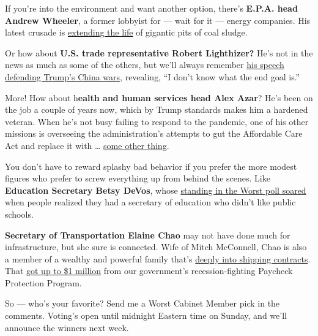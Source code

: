 If you're into the environment and want another option, there's
\textbf{E.P.A. head Andrew Wheeler}, a former lobbyist for --- wait for
it --- energy companies. His latest crusade is
\href{https://thehill.com/policy/energy-environment/509792-epa-rule-extends-life-of-toxic-coal-ash-ponds}{extending
the life} of gigantic pits of coal sludge.

Or how about \textbf{U.S. trade representative Robert Lighthizer?} He's
not in the news as much as some of the others, but we'll always remember
\href{https://www.scmp.com/news/world/united-states-canada/article/3092578/us-negotiator-robert-lighthizer-says-i-dont-know}{his
speech defending Trump's China wars}, revealing, ``I don't know what the
end goal is.''

More! How about h\textbf{ealth and human services head Alex Azar}? He's
been on the job a couple of years now, which by Trump standards makes
him a hardened veteran. When he's not busy failing to respond to the
pandemic, one of his other missions is overseeing the administration's
attempts to gut the Affordable Care Act and replace it with \ldots{}
\href{https://www.bloomberg.com/news/articles/2020-06-28/azar-suggests-no-obamacare-replacement-plan-before-election?sref=Q23PdzcT}{some
other thing}.

You don't have to reward splashy bad behavior if you prefer the more
modest figures who prefer to screw everything up from behind the scenes.
Like \textbf{Education Secretary Betsy DeVos}, whose
\href{https://www.nytimes.com/2017/06/22/opinion/betsy-devos-trump-worst-cabinet-member.html}{standing
in the Worst poll soared} when people realized they had a secretary of
education who didn't like public schools.

\textbf{Secretary of Transportation Elaine Chao} may not have done much
for infrastructure, but she sure is connected. Wife of Mitch McConnell,
Chao is also a member of a wealthy and powerful family that's
\href{https://www.nytimes.com/2019/06/02/us/politics/elaine-chao-china.html}{deeply
into shipping contracts}. That
\href{https://www.courier-journal.com/story/news/politics/2020/07/07/firm-run-elaine-chao-and-mitch-mcconnells-family-got-federal-ppp-loan/5390273002/}{got
up to \$1 million} from our government's recession-fighting Paycheck
Protection Program.

So --- who's your favorite? Send me a Worst Cabinet Member pick in the
comments. Voting's open until midnight Eastern time on Sunday, and we'll
announce the winners next week.

